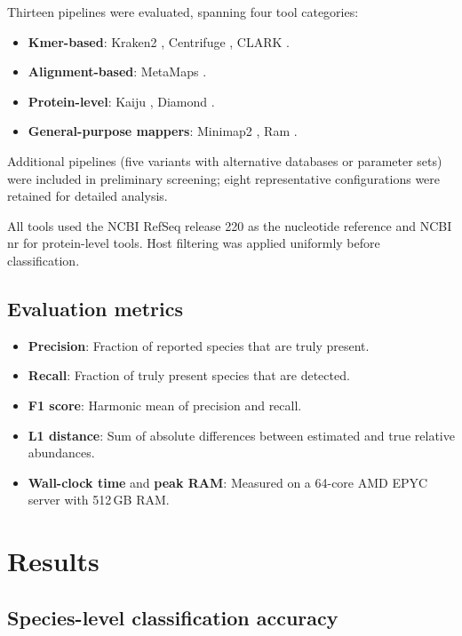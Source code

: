 \documentclass[12pt]{article}
\begin{document}
Thirteen pipelines were evaluated, spanning four tool categories:

\begin{itemize}
    \item \textbf{Kmer-based}: Kraken2 \citep{wood2019improved}, Centrifuge \citep{kim2016centrifuge}, CLARK \citep{ounit2015clark}.
    \item \textbf{Alignment-based}: MetaMaps \citep{dilthey2019strain}.
    \item \textbf{Protein-level}: Kaiju \citep{menzel2016fast}, Diamond \citep{buchfink2021sensitive}.
    \item \textbf{General-purpose mappers}: Minimap2 \citep{li2018minimap2}, Ram \citep{vaser2021time}.
\end{itemize}

Additional pipelines (five variants with alternative databases or parameter sets) were included in preliminary screening; eight representative configurations were retained for detailed analysis.

All tools used the NCBI RefSeq release 220 as the nucleotide reference and NCBI nr for protein-level tools. Host filtering was applied uniformly before classification.

\subsection{Evaluation metrics}

\begin{itemize}
    \item \textbf{Precision}: Fraction of reported species that are truly present.
    \item \textbf{Recall}: Fraction of truly present species that are detected.
    \item \textbf{F1 score}: Harmonic mean of precision and recall.
    \item \textbf{L1 distance}: Sum of absolute differences between estimated and true relative abundances.
    \item \textbf{Wall-clock time} and \textbf{peak RAM}: Measured on a 64-core AMD EPYC server with 512\,GB RAM.
\end{itemize}

\section{Results}

\subsection{Species-level classification accuracy}
\end{document}
